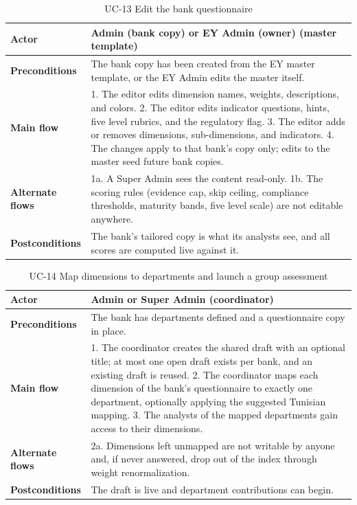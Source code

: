 \begin{table}[H]
\centering
\caption{UC-13 Edit the bank questionnaire}
\label{tab:uc13}
\begin{tabular}{|p{3cm}|p{12cm}|}
\hline
\textbf{Actor} & Admin (bank copy) or EY Admin (owner) (master template) \\
\hline
\textbf{Preconditions} & The bank copy has been created from the EY master template, or the EY Admin edits the master itself. \\
\hline
\textbf{Main flow} & 1. The editor edits dimension names, weights, descriptions, and colors. 2. The editor edits indicator questions, hints, five level rubrics, and the regulatory flag. 3. The editor adds or removes dimensions, sub-dimensions, and indicators. 4. The changes apply to that bank's copy only; edits to the master seed future bank copies. \\
\hline
\textbf{Alternate flows} & 1a. A Super Admin sees the content read-only. 1b. The scoring rules (evidence cap, skip ceiling, compliance thresholds, maturity bands, five level scale) are not editable anywhere. \\
\hline
\textbf{Postconditions} & The bank's tailored copy is what its analysts see, and all scores are computed live against it. \\
\hline
\end{tabular}
\end{table}

\begin{table}[H]
\centering
\caption{UC-14 Map dimensions to departments and launch a group assessment}
\label{tab:uc14}
\begin{tabular}{|p{3cm}|p{12cm}|}
\hline
\textbf{Actor} & Admin or Super Admin (coordinator) \\
\hline
\textbf{Preconditions} & The bank has departments defined and a questionnaire copy in place. \\
\hline
\textbf{Main flow} & 1. The coordinator creates the shared draft with an optional title; at most one open draft exists per bank, and an existing draft is reused. 2. The coordinator maps each dimension of the bank's questionnaire to exactly one department, optionally applying the suggested Tunisian mapping. 3. The analysts of the mapped departments gain access to their dimensions. \\
\hline
\textbf{Alternate flows} & 2a. Dimensions left unmapped are not writable by anyone and, if never answered, drop out of the index through weight renormalization. \\
\hline
\textbf{Postconditions} & The draft is live and department contributions can begin. \\
\hline
\end{tabular}
\end{table}

